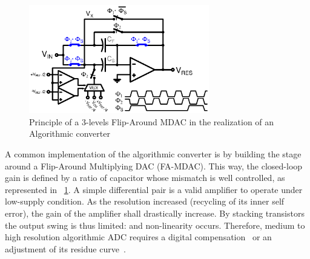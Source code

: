 \begin{figure}[htp]
	\centering
    \includegraphics[width=0.7\textwidth]{Chapter3/Figs/algo_mdac_std.ps}
	\caption{Principle of a 3-levels Flip-Around MDAC in the realization of an Algorithmic converter}
	\label{fig:algo_mdac}
\end{figure}

A common implementation of the algorithmic converter is by building the stage around a Flip-Around Multiplying DAC (FA-MDAC). This way, the closed-loop gain is defined by a ratio of capacitor whose mismatch is well controlled, as represented in \figurename~\ref{fig:algo_mdac}. A simple differential pair is a valid amplifier to operate under low-supply condition. As the resolution increased (recycling of its inner self error), the gain of the amplifier shall drastically increase. By stacking transistors the output swing is thus limited: and non-linearity occurs. Therefore, medium to high resolution algorithmic ADC requires a digital compensation~\cite{Murmann2003} or an adjustment of its residue curve~\cite{Inoue2017,Naderi2017}.

